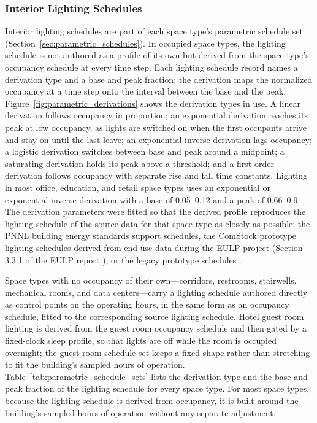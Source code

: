 \subsubsection{Interior Lighting Schedules}
\label{sec:derived_schedules}
Interior lighting schedules are part of each space type's parametric schedule set (Section~\ref{sec:parametric_schedules}). In occupied space types, the lighting schedule is not authored as a profile of its own but derived from the space type's occupancy schedule at every time step. Each lighting schedule record names a derivation type and a base and peak fraction; the derivation maps the normalized occupancy at a time step onto the interval between the base and the peak. Figure~\ref{fig:parametric_derivations} shows the derivation types in use. A linear derivation follows occupancy in proportion; an exponential derivation reaches its peak at low occupancy, as lights are switched on when the first occupants arrive and stay on until the last leave; an exponential-inverse derivation lags occupancy; a logistic derivation switches between base and peak around a midpoint; a saturating derivation holds its peak above a threshold; and a first-order derivation follows occupancy with separate rise and fall time constants. Lighting in most office, education, and retail space types uses an exponential or exponential-inverse derivation with a base of 0.05--0.12 and a peak of 0.66--0.9. The derivation parameters were fitted so that the derived profile reproduces the lighting schedule of the source data for that space type as closely as possible: the PNNL building energy standards support schedules, the ComStock prototype lighting schedules derived from end-use data during the EULP project (Section 3.3.1 of the EULP report \citep{eulp_final_report}), or the legacy prototype schedules \citep{deru_2011}.

Space types with no occupancy of their own---corridors, restrooms, stairwells, mechanical rooms, and data centers---carry a lighting schedule authored directly as control points on the operating hours, in the same form as an occupancy schedule, fitted to the corresponding source lighting schedule. Hotel guest room lighting is derived from the guest room occupancy schedule and then gated by a fixed-clock sleep profile, so that lights are off while the room is occupied overnight; the guest room schedule set keeps a fixed shape rather than stretching to fit the building's sampled hours of operation. Table~\ref{tab:parametric_schedule_sets} lists the derivation type and the base and peak fraction of the lighting schedule for every space type. For most space types, because the lighting schedule is derived from occupancy, it is built around the building's sampled hours of operation without any separate adjustment.

